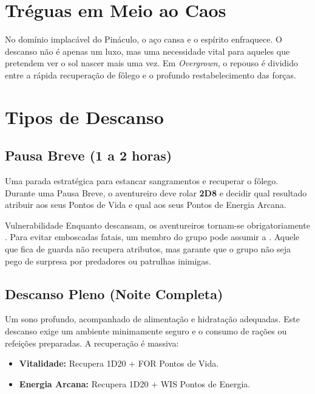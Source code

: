 
\section*{Tréguas em Meio ao Caos}

No domínio implacável do Pináculo, o aço cansa e o espírito enfraquece. O descanso não é apenas um luxo, mas uma necessidade vital para aqueles que pretendem ver o sol nascer mais uma vez. Em \textit{Overgrown}, o repouso é dividido entre a rápida recuperação de fôlego e o profundo restabelecimento das forças.

\section*{Tipos de Descanso}

\subsection*{Pausa Breve (1 a 2 horas)}
Uma parada estratégica para estancar sangramentos e recuperar o fôlego. Durante uma Pausa Breve, o aventureiro deve rolar \textbf{2D8} e decidir qual resultado atribuir aos seus Pontos de Vida e qual aos seus Pontos de Energia Arcana. 

\begin{rpgboxtips}{Vulnerabilidade}
Enquanto descansam, os aventureiros tornam-se obrigatoriamente . Para evitar emboscadas fatais, um membro do grupo pode assumir a . Aquele que fica de guarda não recupera atributos, mas garante que o grupo não seja pego de surpresa por predadores ou patrulhas inimigas.
\end{rpgboxtips}

\subsection*{Descanso Pleno (Noite Completa)}
Um sono profundo, acompanhado de alimentação e hidratação adequadas. Este descanso exige um ambiente minimamente seguro e o consumo de rações ou refeições preparadas. A recuperação é massiva:
\begin{itemize}
    \item \textbf{Vitalidade:} Recupera 1D20 + FOR Pontos de Vida.
    \item \textbf{Energia Arcana:} Recupera 1D20 + WIS Pontos de Energia.
\end{itemize}

